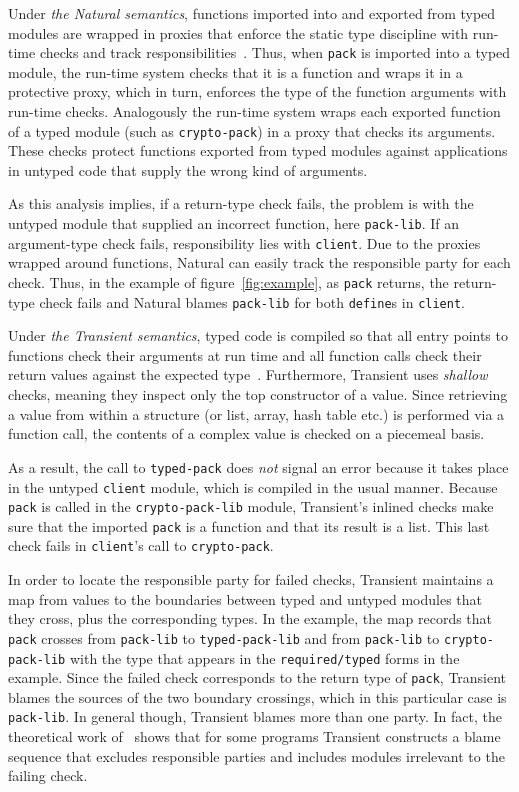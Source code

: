 Under {\it the Natural semantics\/}, functions imported into and exported from
typed modules are wrapped in proxies that enforce the static type discipline
with run-time checks and track responsibilities~\cite{tf-popl-2008,
tfffgksst-snapl-2017}. Thus, when {\tt pack} is imported into a typed module,
the run-time system checks that it is a function and wraps it in a protective
proxy, which in turn, enforces the type of the function arguments with run-time checks.
Analogously the run-time system wraps each exported function of a typed module
(such as {\tt crypto-pack}) in a proxy that checks its arguments.  These checks
protect functions exported from typed modules against applications in untyped
code that supply the wrong kind of arguments.

As this analysis implies, if a return-type check fails, the problem is with
the untyped module that supplied an incorrect function, here {\tt pack-lib}. If
an argument-type check fails, responsibility lies with {\tt client}. Due to the
proxies wrapped around functions, Natural can easily track the responsible party
for each check. Thus, in the example of figure~\ref{fig:example}, as
\texttt{pack} returns, the return-type check fails and Natural blames
\texttt{pack-lib} for both {\tt define}s in {\tt client}.

Under {\it the Transient semantics\/}, typed code is compiled so that all entry
points to functions check their arguments at run time and all function calls
check their return values against the expected type~\cite{vss-popl-2017}.
Furthermore, Transient uses \emph{shallow} checks, meaning they inspect only the
top constructor of a value. Since retrieving a value from within a structure (or
list, array, hash table etc.) is performed via a function call, the contents of a
complex value is checked on a piecemeal basis.

As a result, the call to \texttt{typed-pack} does {\em not\/} signal an error
because it takes place in the untyped {\tt client} module, which is compiled in
the usual manner. Because {\tt pack} is called in the {\tt crypto-pack-lib}
module, Transient's inlined checks make sure that the imported
\texttt{pack} is a function and that its result is a list. This
last check fails in \texttt{client}'s call to {\tt crypto-pack}.

In order to locate the responsible party for failed checks, Transient
maintains a map from values to the boundaries between typed and untyped modules that
they cross, plus the corresponding types. In the example, the map records that
\texttt{pack} crosses from \texttt{pack-lib} to {\tt typed-pack-lib} and
from {\tt pack-lib} to {\tt crypto-pack-lib} with the type that appears in the
{\tt required/typed} forms in the example. Since the failed check corresponds to
the return type of \texttt{pack}, Transient blames the sources of the two
boundary crossings, which in this particular case is \texttt{pack-lib}. In
general though, Transient blames more than one party. In fact, the theoretical
work of~\citet{gfd-oopsla-2019} shows that for some programs Transient
constructs a blame sequence that excludes responsible parties and includes modules
irrelevant to the failing check.

